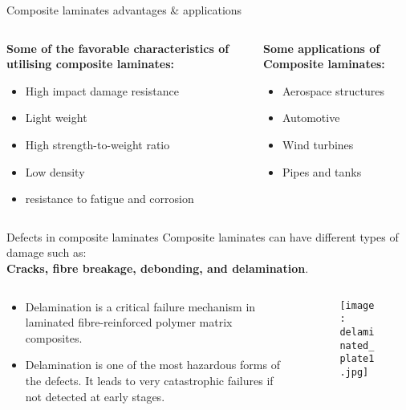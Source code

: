 \documentclass[10pt,aspectratio=169,dvipsnames]{beamer} %
\begin{document}
	\begin{frame}{Composite laminates advantages \& applications}
		\begin{columns}[T]
			\begin{column}[t]{.45\textwidth}
				\textbf{Some of the favorable characteristics of utilising composite laminates:}
				\begin{itemize}
					\item \alert{High impact damage resistance}
					\item \alert{Light weight}
					\item \alert{High strength-to-weight ratio}
					\item \alert{Low density}
					\item \alert{resistance to fatigue and corrosion}
				\end{itemize}
			\end{column}
			\begin{column}[t]{.45\textwidth}
				\textbf{Some applications of Composite laminates:}
				\begin{itemize}
					\item \alert{Aerospace structures}
					\item \alert{Automotive}
					\item \alert{Wind turbines}
					\item \alert{Pipes and tanks}
				\end{itemize}
			\end{column}
		\end{columns}
	\end{frame}
	\begin{frame}{Defects in composite laminates}
		\small
		Composite laminates can have different types of damage such as: \\
		\textbf{Cracks, fibre breakage, debonding, and \alert{delamination}}.
		\begin{columns}[T]
			\begin{column}[c]{.45\textwidth}
				\begin{itemize}
					\footnotesize
					\item Delamination is a critical failure mechanism in laminated fibre-reinforced polymer matrix composites.
					\item Delamination is one of the most hazardous forms of the defects. 
					It leads to very catastrophic failures if not detected at early stages.
				\end{itemize}
			\end{column}
			\begin{column}[c]{0.50\textwidth}
				\begin{figure}
					\texttt{[image: delaminated\_plate1.jpg]}
				\end{figure}
			\end{column}
		\end{columns}
	\end{frame}
	
\end{document}
